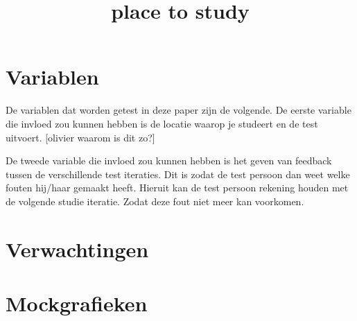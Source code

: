 \documentclass{hogent-article}
\begin{document}
	\title{place to study}
	\autocite{smith1978environmental, smith1984contextual}
	
	\section{Variablen}
	De variablen dat worden getest in deze paper zijn de volgende.
	De eerste variable die invloed zou kunnen hebben is de locatie waarop je studeert en de test uitvoert.
	[olivier waarom is dit zo?]
	
	De tweede variable die invloed zou kunnen hebben is het geven van feedback tussen de verschillende test iteraties. 
	Dit is zodat de test persoon dan weet welke fouten hij/haar gemaakt heeft. Hieruit kan de test persoon rekening houden met de volgende studie iteratie. Zodat deze fout niet meer kan voorkomen. 
	
	
	\section{Verwachtingen}
	
	
	\section{Mockgrafieken}
	
	\printbibliography[heading=bibintoc]
	
\end{document}
